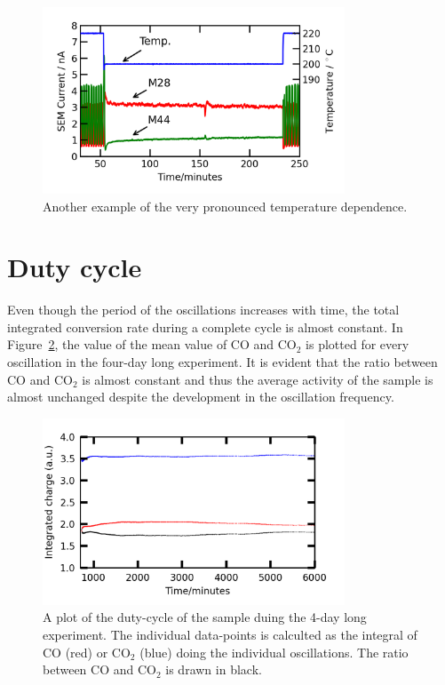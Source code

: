 \documentclass[8.5pt,twoside,twocolumn]{article}
\begin{document}
\begin{figure}[h]
\centering
  \includegraphics[width=9cm]{temperature_dependence_supplemental.png}
  \caption{Another example of the very pronounced temperature dependence.}
  \label{fgr:temperature_dependence_supplemental}
\end{figure}

\section{Duty cycle}
Even though the period of the oscillations increases with time, the total integrated conversion rate during a complete cycle is almost constant. In Figure~\ref{fgr:duty_cycles_supplemental}, the value of the mean value of CO and CO$_2$ is plotted for every oscillation in the four-day long experiment. It is evident that the ratio between CO and CO$_2$ is almost constant and thus the average activity of the sample is almost unchanged despite the development in the oscillation frequency.


\begin{figure}[h]
\centering
  \includegraphics[width=9cm]{duty_cycles_long_measurement_supplemental.png}
  \caption{A plot of the duty-cycle of the sample duing the 4-day long experiment. The individual data-points is calculted as the integral of CO (red) or CO$_2$ (blue) doing the individual oscillations. The ratio between CO and CO$_2$ is drawn in black.}
  \label{fgr:duty_cycles_supplemental}
\end{figure}



\footnotesize{
}
\end{document}
